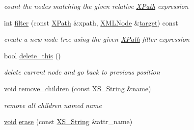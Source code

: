 \begin{DoxyCompactItemize}
\begin{DoxyCompactList}\small\item\em count the nodes matching the given relative \hyperlink{struct_x_m_l_storage_1_1_x_path}{X\+Path} expression \end{DoxyCompactList}\item 
\mbox{\label{struct_x_m_l_storage_1_1_x_m_l_pos_af66c7517414a2083de35140407c14037}} 
int \hyperlink{struct_x_m_l_storage_1_1_x_m_l_pos_af66c7517414a2083de35140407c14037}{filter} (const \hyperlink{struct_x_m_l_storage_1_1_x_path}{X\+Path} \&xpath, \hyperlink{struct_x_m_l_storage_1_1_x_m_l_node}{X\+M\+L\+Node} \&\hyperlink{interfacevoid}{target}) const
\begin{DoxyCompactList}\small\item\em create a new node tree using the given \hyperlink{struct_x_m_l_storage_1_1_x_path}{X\+Path} filter expression \end{DoxyCompactList}\item 
\mbox{\label{struct_x_m_l_storage_1_1_x_m_l_pos_a1b71cadfcad4b0da6bb757f7993656b0}} 
bool \hyperlink{struct_x_m_l_storage_1_1_x_m_l_pos_a1b71cadfcad4b0da6bb757f7993656b0}{delete\+\_\+this} ()
\begin{DoxyCompactList}\small\item\em delete current node and go back to previous position \end{DoxyCompactList}\item 
\mbox{\label{struct_x_m_l_storage_1_1_x_m_l_pos_a76e1461e6c914c750e2a8280bddcfe89}} 
\hyperlink{interfacevoid}{void} \hyperlink{struct_x_m_l_storage_1_1_x_m_l_pos_a76e1461e6c914c750e2a8280bddcfe89}{remove\+\_\+children} (const \hyperlink{struct_x_m_l_storage_1_1_x_s___string}{X\+S\+\_\+\+String} \&\hyperlink{structname}{name})
\begin{DoxyCompactList}\small\item\em remove all children named \textquotesingle{}name\textquotesingle{} \end{DoxyCompactList}\item 
\mbox{\label{struct_x_m_l_storage_1_1_x_m_l_pos_aee2360dc7f2fa7b10b2b4a1fc0d5b6f2}} 
\hyperlink{interfacevoid}{void} \hyperlink{struct_x_m_l_storage_1_1_x_m_l_pos_aee2360dc7f2fa7b10b2b4a1fc0d5b6f2}{erase} (const \hyperlink{struct_x_m_l_storage_1_1_x_s___string}{X\+S\+\_\+\+String} \&attr\+\_\+name)

\end{DoxyCompactItemize}
